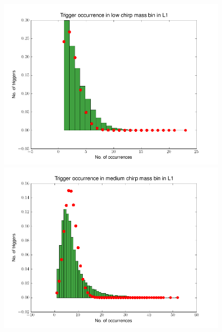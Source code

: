 \documentclass[epsf]{article}
\begin{document}
\begin{figure}[ht!]
\begin{minipage}[b]{0.5\linewidth}
\centering
\includegraphics[scale=0.45]{l1_low_distribution.png}
\end{minipage}
\begin{minipage}[b]{0.5\linewidth}
\centering
\includegraphics[scale=0.45]{l1_medium_distribution.png}
\end{minipage}

\end{figure}
\end{document}
